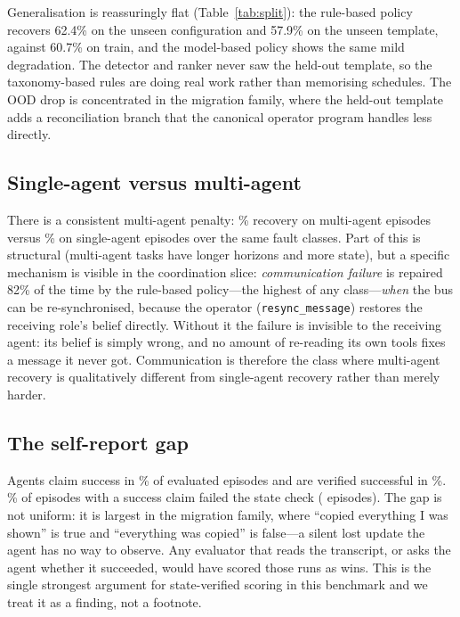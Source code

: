 

Generalisation is reassuringly flat (Table~\ref{tab:split}): the rule-based policy recovers 62.4\% on
the unseen configuration and 57.9\% on the unseen template, against 60.7\% on train, and the
model-based policy shows the same mild degradation. The detector and ranker never saw the held-out
template, so the taxonomy-based rules are doing real work rather than memorising schedules. The OOD
drop is concentrated in the migration family, where the held-out template adds a reconciliation
branch that the canonical operator program handles less directly.

\subsection{Single-agent versus multi-agent}

There is a consistent multi-agent penalty: \MultiRecovery\% recovery on multi-agent episodes versus
\SingleRecovery\% on single-agent episodes over the same fault classes. Part of this is structural
(multi-agent tasks have longer horizons and more state), but a specific mechanism is visible in the
coordination slice: \emph{communication failure} is repaired 82\% of the time by the rule-based
policy---the highest of any class---\emph{when} the bus can be re-synchronised, because the operator
(\texttt{resync\_message}) restores the receiving role's belief directly. Without it the failure is
invisible to the receiving agent: its belief is simply wrong, and no amount of re-reading its own
tools fixes a message it never got. Communication is therefore the class where multi-agent recovery
is qualitatively different from single-agent recovery rather than merely harder.

\subsection{The self-report gap}

Agents claim success in \ClaimedPct\% of evaluated episodes and are verified successful in
\VerifiedPct\%. \FalseClaimPct\% of episodes with a success claim failed the state check
(\FalseClaimN{} episodes). The gap is not uniform: it is largest in the migration family, where
``copied everything I was shown'' is true and ``everything was copied'' is false---a silent lost
update the agent has no way to observe. Any evaluator that reads the transcript, or asks the agent
whether it succeeded, would have scored those runs as wins. This is the single strongest argument for
state-verified scoring in this benchmark and we treat it as a finding, not a footnote.

